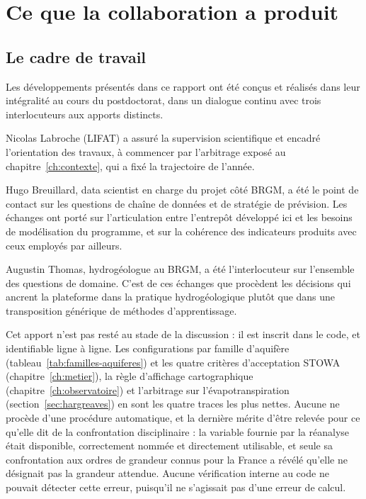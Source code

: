 \chapter{Ce que la collaboration a produit}
\label{ch:collaborations}



\section{Le cadre de travail}

Les développements présentés dans ce rapport ont été conçus et réalisés dans leur intégralité au
cours du postdoctorat, dans un dialogue continu avec trois interlocuteurs aux apports distincts.

Nicolas Labroche (LIFAT) a assuré la supervision scientifique et encadré l'orientation des
travaux, à commencer par l'arbitrage exposé au chapitre~\ref{ch:contexte}, qui a fixé la
trajectoire de l'année.

Hugo Breuillard, data scientist en charge du projet côté BRGM, a été le point de contact sur les
questions de chaîne de données et de stratégie de prévision. Les échanges ont porté sur
l'articulation entre l'entrepôt développé ici et les besoins de modélisation du programme, et
sur la cohérence des indicateurs produits avec ceux employés par ailleurs.

Augustin Thomas, hydrogéologue au BRGM, a été l'interlocuteur sur l'ensemble des questions de
domaine. C'est de ces échanges que procèdent les décisions qui ancrent la plateforme dans la
pratique hydrogéologique plutôt que dans une transposition générique de méthodes
d'apprentissage.

Cet apport n'est pas resté au stade de la discussion : il est inscrit dans le code, et
identifiable ligne à ligne. Les configurations par famille d'aquifère (tableau~\ref{tab:familles-aquiferes}) et les quatre
critères d'acceptation STOWA (chapitre~\ref{ch:metier}), la règle d'affichage cartographique
(chapitre~\ref{ch:observatoire}) et l'arbitrage sur l'évapotranspiration
(section~\ref{sec:hargreaves}) en sont les quatre traces les plus nettes. Aucune ne procède
d'une procédure automatique, et la dernière mérite d'être relevée pour ce qu'elle dit de la
confrontation disciplinaire : la variable fournie par la réanalyse était disponible,
correctement nommée et directement utilisable, et seule sa confrontation aux ordres de grandeur
connus pour la France a révélé qu'elle ne désignait pas la grandeur attendue. Aucune
vérification interne au code ne pouvait détecter cette erreur, puisqu'il ne s'agissait pas d'une
erreur de calcul.

